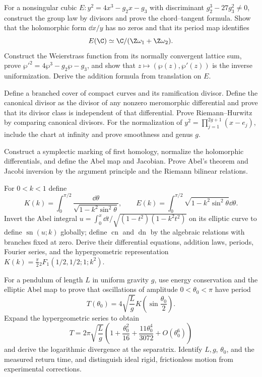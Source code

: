\begin{exercise}
For a nonsingular cubic
$E:y^2=4x^3-g_2x-g_3$ with discriminant $g_2^3-27g_3^2\ne0$, construct the
group law by divisors and prove the chord--tangent formula.  Show that the
holomorphic form $\dd x/y$ has no zeros and that its period map identifies
\[
 E(\C)\simeq\C/(\Z\omega_1+\Z\omega_2).
\]
Construct the Weierstrass function from its normally convergent lattice sum,
prove $\wp'^2=4\wp^3-g_2\wp-g_3$, and show that $z\mapsto(\wp(z),\wp'(z))$
is the inverse uniformization.  Derive the addition formula from translation
on $E$.
\end{exercise}

\begin{exercise}
Define a branched cover of compact curves and its ramification divisor.
Define the canonical divisor as the divisor of any nonzero meromorphic
differential and prove that its divisor class is independent of that
differential.  Prove Riemann--Hurwitz by comparing canonical divisors.  For the normalization
of $y^2=\prod_{j=1}^{2g+1}(x-e_j)$, include the chart at infinity and prove
smoothness and genus $g$.
\end{exercise}

\begin{exercise}
Construct a symplectic marking of first homology,
normalize the holomorphic differentials, and define the Abel map and Jacobian.
Prove Abel's theorem and Jacobi inversion by the argument principle and the
Riemann bilinear relations.
\end{exercise}

\begin{exercise}
For $0<k<1$ define
\[
 K(k)=\int_0^{\pi/2}\frac{\dd\theta}
 {\sqrt{1-k^2\sin^2\theta}},\qquad
 E(k)=\int_0^{\pi/2}\sqrt{1-k^2\sin^2\theta}\dd\theta.
\]
Invert the Abel integral
$u=\int_0^x\dd t/\sqrt{(1-t^2)(1-k^2t^2)}$ on its elliptic curve to define
$\operatorname{sn}(u;k)$ globally; define $\operatorname{cn}$ and
$\operatorname{dn}$ by the algebraic relations with branches fixed at zero.
Derive their differential equations, addition laws, periods, Fourier series,
and the hypergeometric representation
$K(k)=\frac\pi2{}_2F_1(1/2,1/2;1;k^2)$.
\end{exercise}

\begin{exercise}
For a pendulum of length $L$ in uniform gravity $g$, use energy conservation
and the elliptic Abel map to prove that oscillations of amplitude
$0<\theta_0<\pi$ have period
\[
 T(\theta_0)=4\sqrt{\frac Lg}
 K\!\left(\sin\frac{\theta_0}{2}\right).
\]
Expand the hypergeometric series to obtain
\[
 T=2\pi\sqrt{\frac Lg}
 \left(1+\frac{\theta_0^2}{16}
 +\frac{11\theta_0^4}{3072}+O(\theta_0^6)\right)
\]
and derive the logarithmic divergence at the separatrix.  Identify $L,g$,
$\theta_0$, and the measured return time, and distinguish ideal rigid,
frictionless motion from experimental corrections.
\end{exercise}

